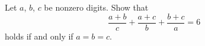 Let $a$, $b$, $c$ be nonzero digits. Show that
\[
\dfrac{a+b}{c}+\dfrac{a+c}{b}+\dfrac{b+c}{a}=6
\]
holds if and only if $a=b=c$.

